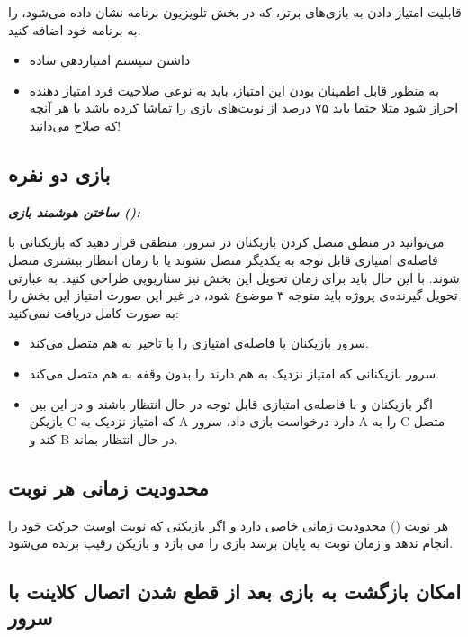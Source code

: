 \documentclass[]{article}
\begin{document}
قابلیت امتیاز دادن به بازی‌های برتر، که در بخش تلویزیون برنامه نشان داده می‌شود، را به برنامه خود اضافه کنید.
\begin{itemize}
	\item داشتن سیستم امتیازدهی ساده
	\item به منظور قابل اطمینان بودن این امتیاز، باید به نوعی صلاحیت فرد امتیاز دهنده احراز شود مثلا حتما باید ۷۵ درصد از نوبت‌های بازی را تماشا کرده باشد یا هر آنچه که صلاح می‌دانید!
\end{itemize}

\subsection*{{\titr بازی دو نفره}}

\textbf{\emph{ساختن هوشمند بازی ():}}

می‌توانید در منطق متصل کردن بازیکنان در سرور، منطقی قرار دهید که بازیکنانی با فاصله‌ی امتیازی قابل توجه به یکدیگر متصل نشوند یا با زمان انتظار بیشتری متصل شوند. با این حال باید برای زمان تحویل این بخش نیز سناریویی طراحی کنید.
به عبارتی تحویل گیرنده‌ی پروژه باید متوجه ۳ موضوع شود، در غیر این صورت امتیاز این بخش را به صورت کامل دریافت نمی‌کنید:

\begin{itemize}
	\item سرور بازیکنان با فاصله‌ی امتیازی را با تاخیر به هم متصل می‌کند.
	\item سرور بازیکنانی که امتیاز نزدیک به هم دارند را بدون وقفه به هم متصل می‌کند.
	\item اگر بازیکنان  و  با فاصله‌ی امتیازی قابل توجه در حال انتظار باشند و در این بین بازیکن C که امتیاز نزدیک به A دارد درخواست بازی داد، سرور A را به C متصل کند و B در حال انتظار بماند.
\end{itemize}

\subsection*{{\titr محدودیت زمانی هر نوبت}}

هر نوبت () محدودیت زمانی خاصی دارد و اگر بازیکنی که نوبت اوست حرکت خود را انجام ندهد و زمان نوبت به پایان برسد بازی را می بازد و بازیکن رقیب برنده می‌شود.

\subsection*{{\titr امکان بازگشت به بازی بعد از قطع شدن اتصال کلاینت با سرور}}
\end{document}
